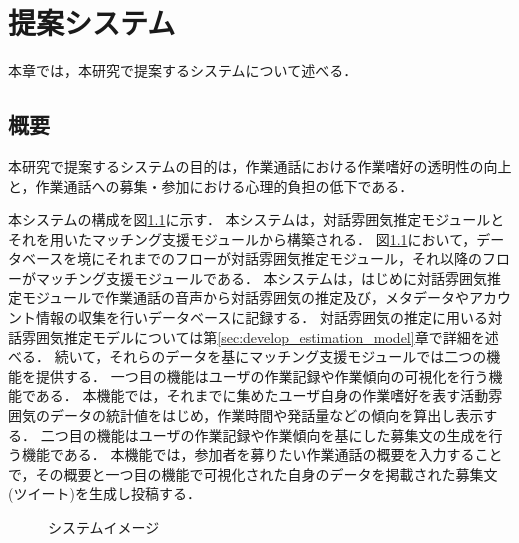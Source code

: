 \chapter{提案システム\label{sec:proposal_system}}
\thispagestyle{plain}

本章では，本研究で提案するシステムについて述べる．

\section{概要}

本研究で提案するシステムの目的は，作業通話における作業嗜好の透明性の向上と，作業通話への募集・参加における心理的負担の低下である．

本システムの構成を図\ref{fig:matching_system_big_arrow}に示す．
本システムは，対話雰囲気推定モジュールとそれを用いたマッチング支援モジュールから構築される．
図\ref{fig:matching_system_big_arrow}において，データベースを境にそれまでのフローが対話雰囲気推定モジュール，それ以降のフローがマッチング支援モジュールである．
本システムは，はじめに対話雰囲気推定モジュールで作業通話の音声から対話雰囲気の推定及び，メタデータやアカウント情報の収集を行いデータベースに記録する．
対話雰囲気の推定に用いる対話雰囲気推定モデルについては第\ref{sec:develop_estimation_model}章で詳細を述べる．
続いて，それらのデータを基にマッチング支援モジュールでは二つの機能を提供する．
一つ目の機能はユーザの作業記録や作業傾向の可視化を行う機能である．
本機能では，それまでに集めたユーザ自身の作業嗜好を表す活動雰囲気のデータの統計値をはじめ，作業時間や発話量などの傾向を算出し表示する．
二つ目の機能はユーザの作業記録や作業傾向を基にした募集文の生成を行う機能である．
本機能では，参加者を募りたい作業通話の概要を入力することで，その概要と一つ目の機能で可視化された自身のデータを掲載された募集文(ツイート)を生成し投稿する．

\begin{figure}
    \centering
    \caption{システムイメージ}
    \label{fig:matching_system_big_arrow}
\end{figure}

